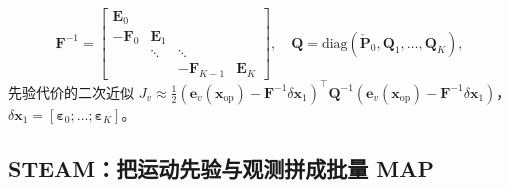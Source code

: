 \begin{equation}
  \mathbf{F}^{-1}=\begin{bmatrix}\mathbf{E}_0&&&\\-\mathbf{F}_0&\mathbf{E}_1&&\\&\ddots&\ddots&\\&&-\mathbf{F}_{K-1}&\mathbf{E}_K\end{bmatrix},\quad
  \mathbf{Q}=\mathrm{diag}(\check{\mathbf{P}}_0,\mathbf{Q}_1,\dots,\mathbf{Q}_K),
  \label{eq:steam-Finv}
\end{equation}
先验代价的二次近似 $J_v\approx\tfrac12(\mathbf{e}_v(\mathbf{x}_{\mathrm{op}})-\mathbf{F}^{-1}\delta\mathbf{x}_1)^\top\mathbf{Q}^{-1}(\mathbf{e}_v(\mathbf{x}_{\mathrm{op}})-\mathbf{F}^{-1}\delta\mathbf{x}_1)$，$\delta\mathbf{x}_1=[\boldsymbol{\varepsilon}_0;\dots;\boldsymbol{\varepsilon}_K]$。

\subsection{STEAM：把运动先验与观测拼成批量 MAP}
\label{sec:est-steam-map}

